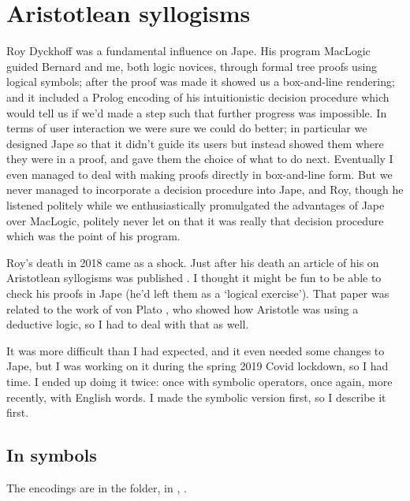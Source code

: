 \chapter{Aristotlean syllogisms}
\label{chap:Aristotle}

Roy Dyckhoff was a fundamental influence on Jape. His program MacLogic \citep{dyckhoff1989malt} guided Bernard and me, both logic novices, through formal tree proofs using logical symbols; after the proof was made it showed us a box-and-line rendering; and it included a Prolog encoding of his intuitionistic decision procedure \citep{dyckhoff1992contraction} which would tell us if we'd made a step such that further progress was impossible. In terms of user interaction we were sure we could do better; in particular we designed Jape so that it didn't guide its users but instead showed them where they were in a proof, and gave them the choice of what to do next. Eventually I even managed to deal with making proofs directly in box-and-line form. But we never managed to incorporate a decision procedure into Jape, and Roy, though he listened politely while we enthusiastically promulgated the advantages of Jape over MacLogic, politely never let on that it was really that decision procedure which was the point of his program. 

Roy's death in 2018 came as a shock. Just after his death an article of his on Aristotlean syllogisms was published \citep{dyckhoff2019indefinite}. I thought it might be fun to be able to check his proofs in Jape (he'd left them as a `logical exercise'). That paper was related to the work of von Plato \citep{von2016aristotle}, who showed how Aristotle was using a deductive logic, so I had to deal with that as well.

It was more difficult than I had expected, and it even needed some changes to Jape, but I was working on it during the spring 2019 Covid lockdown, so I had time. I ended up doing it twice: once with symbolic operators, once again, more recently, with English words. I made the symbolic version first, so I describe it first.

\section{In symbols}

The encodings are in the  folder, in , .

